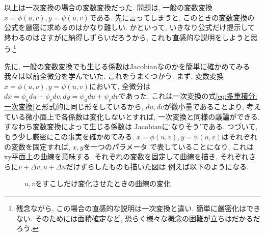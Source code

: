 \documentclass[a4j,dvipdfmx]{jsarticle}
\numberwithin{equation}{section}
\begin{document}
            以上は一次変換の場合の変数変換だった. 問題は, 一般の変数変換$x=\phi(u,v),y=\psi(u,v)$である. 先に言ってしまうと, このときの変数変換の公式を厳密に求めるのはかなり難しい.
            かといって, いきなり公式だけ提示して終わるのはさすがに納得しずらいだろうから, これも直感的な説明をしようと思う.\footnote{残念ながら, この場合の直感的な説明は一次変換と違い, 簡単に厳密化はできない. そのためには面積確定など, 恐らく様々な概念の困難が立ちはだかるだろう.}
            
            先に, 一般の変数変換でも生じる係数はJacobianなのかを簡単に確かめてみる. 我々は以前全微分を学んでいた. これをうまくつかう. まず, 変数変換$x=\phi(u,v),y=\psi(u,v)$において, 全微分は$dx=\phi_udu+\phi_vdv, dy=\psi_udu+\psi_vdv$であった.
            これは一次変換の式\eqref{eq:多重積分:一次変換}と形式的に同じ形をしているから, $du,dv$が微小量であることより, 考えている微小面上で各係数は変化しないとすれば, 一次変換と同様の議論ができる. すなわち変数変換によって生じる係数は
            Jacobianに`なりそう'である.
            \clearpage
            つづいて, もう少し厳密にこの事実を確かめてみる. $x=\phi(u,v),y=\psi(u,v)$はそれぞれの変数を固定すれば, $x,y$を一つのパラメータ
            で表していることになり, これはxy平面上の曲線を意味する. それぞれの変数を固定して曲線を描き, それぞれさらに$v+\Delta v,u+\Delta u$だけずらしたものも描いた図は
            例えば以下のようになる.
            \begin{figure}[h]
                \centering
                \caption{$u,v$をすこしだけ変化させたときの曲線の変化}
            \end{figure}
\end{document}
